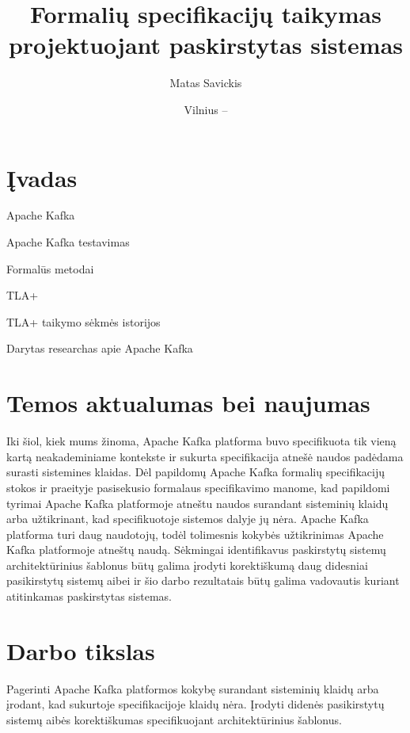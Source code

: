 \documentclass{VUMIFPSmagistrinis}
\title{Formalių specifikacijų taikymas projektuojant paskirstytas sistemas}
\author{Matas Savickis}
\date{Vilnius – \the\year}
\begin{document}
\maketitle

\tableofcontents

	\section{Įvadas}

		


 		Apache Kafka


		Apache Kafka testavimas


		Formalūs metodai


		TLA+


		TLA+ taikymo sėkmės istorijos


		Darytas researchas apie Apache Kafka

	\section{Temos aktualumas bei naujumas}
		Iki šiol, kiek mums žinoma, Apache Kafka platforma buvo specifikuota tik vieną kartą neakademiniame kontekste ir sukurta specifikacija atnešė naudos padėdama surasti sistemines klaidas.
		Dėl papildomų Apache Kafka formalių specifikacijų stokos ir praeityje pasisekusio formalaus specifikavimo manome, kad papildomi tyrimai Apache Kafka platformoje atneštu naudos surandant sisteminių klaidų arba užtikrinant, kad specifikuotoje sistemos dalyje jų nėra.
		Apache Kafka platforma turi daug naudotojų, todėl tolimesnis kokybės užtikrinimas Apache Kafka platformoje atneštų naudą.
		Sėkmingai identifikavus paskirstytų sistemų architektūrinius šablonus būtų galima įrodyti korektiškumą daug didesniai pasikirstytų sistemų aibei ir šio darbo rezultatais būtų galima vadovautis kuriant atitinkamas paskirstytas sistemas. 
	
	\section{Darbo tikslas}
		Pagerinti Apache Kafka platformos kokybę surandant sisteminių klaidų arba įrodant, kad sukurtoje specifikacijoje klaidų nėra.
		Įrodyti didenės pasikirstytų sistemų aibės korektiškumas specifikuojant architektūrinius šablonus.
	
\end{document}

